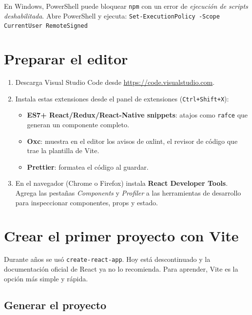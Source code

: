 \documentclass[11pt,a4paper]{article}
\newcommand{\cmd}[1]{\texttt{\color{reactdark}#1}}
\begin{document}
\begin{atencion}
En Windows, PowerShell puede bloquear \cmd{npm} con un error de \emph{ejecución de scripts deshabilitada}. Abre PowerShell y ejecuta:
\cmd{Set-ExecutionPolicy -Scope CurrentUser RemoteSigned}
\end{atencion}

\section{Preparar el editor}

\begin{enumerate}[leftmargin=*]
  \item Descarga Visual Studio Code desde \url{https://code.visualstudio.com}.
  \item Instala estas extensiones desde el panel de extensiones (\cmd{Ctrl+Shift+X}):
  \begin{itemize}
    \item \textbf{ES7+ React/Redux/React-Native snippets}: atajos como \cmd{rafce} que generan un componente completo.
    \item \textbf{Oxc}: muestra en el editor los avisos de oxlint, el revisor de código que trae la plantilla de Vite.
    \item \textbf{Prettier}: formatea el código al guardar.
  \end{itemize}
  \item En el navegador (Chrome o Firefox) instala \textbf{React Developer Tools}. Agrega las pestañas \emph{Components} y \emph{Profiler} a las herramientas de desarrollo para inspeccionar componentes, props y estado.
\end{enumerate}

\section{Crear el primer proyecto con Vite}

\begin{nota}
Durante años se usó \cmd{create-react-app}. Hoy está descontinuado y la documentación oficial de React ya no lo recomienda. Para aprender, Vite es la opción más simple y rápida.
\end{nota}

\subsection{Generar el proyecto}
\end{document}
